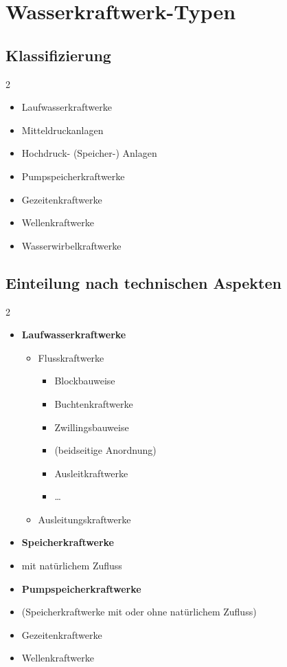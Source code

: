 \section{Wasserkraftwerk-Typen}
\subsection{Klassifizierung}
    \vspace{-4mm}
    \def\columnseprulecolor{\color{white}}
    \begin{multicols}{2}
        \begin{itemize}
            \item Laufwasserkraftwerke
            \item Mitteldruckanlagen
            \item Hochdruck- (Speicher-) Anlagen
            \item Pumpspeicherkraftwerke
            \item Gezeitenkraftwerke
            \item Wellenkraftwerke
            \item Wasserwirbelkraftwerke
        \end{itemize}
    \end{multicols}
    \def\columnseprulecolor{\color{black}}

\subsection{Einteilung nach technischen Aspekten}
\vspace{-4mm}
    \def\columnseprulecolor{\color{white}}
    \begin{multicols}{2}
\begin{itemize}
    \item \textbf{Laufwasserkraftwerke}
    \begin{itemize}
        \item Flusskraftwerke
        \begin{itemize}
            \item Blockbauweise
            \item Buchtenkraftwerke
            \item Zwillingsbauweise 
            \item[] (beidseitige Anordnung)
            \item Ausleitkraftwerke
            \item \dots
        \end{itemize}
        \item Ausleitungskraftwerke
    \end{itemize}
    \item \textbf{Speicherkraftwerke} 
    \item[] mit natürlichem Zufluss
    \item \textbf{Pumpspeicherkraftwerke} 
    \item[] (Speicherkraftwerke mit oder ohne natürlichem Zufluss)
    \item Gezeitenkraftwerke
    \item Wellenkraftwerke
\end{itemize}
\end{multicols}
\def\columnseprulecolor{\color{black}}

